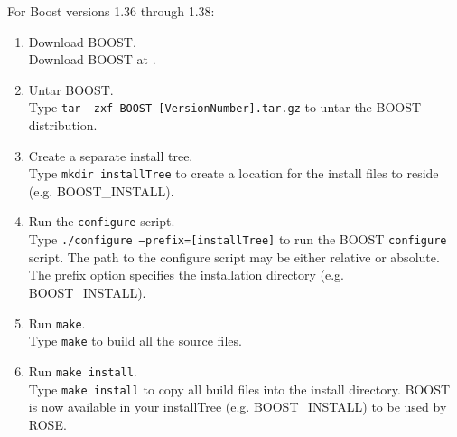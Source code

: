 For Boost versions 1.36 through 1.38:
\begin{enumerate}
     \item Download BOOST. \\
       Download BOOST at .
     \item Untar BOOST. \\
       Type {\tt tar -zxf BOOST-[VersionNumber].tar.gz} to untar the BOOST distribution.
     \item Create a separate install tree. \\
           Type {\tt mkdir installTree} to create a location for the install files to reside (e.g. BOOST\_INSTALL).
     \item Run the {\tt configure} script. \\
           Type {\tt ./configure --prefix=[installTree]} 
           to run the BOOST {\tt configure} script.  The path to the configure script 
           may be either relative or absolute. The prefix option specifies the installation directory (e.g. BOOST\_INSTALL).
     \item Run {\tt make}. \\
           Type {\tt make} to build all the source files. 
     \item Run {\tt make install}. \\
           Type {\tt make install} to copy all build files into the install directory. BOOST is now available in your 
           installTree (e.g. BOOST\_INSTALL) to be used by ROSE.
\end{enumerate}



